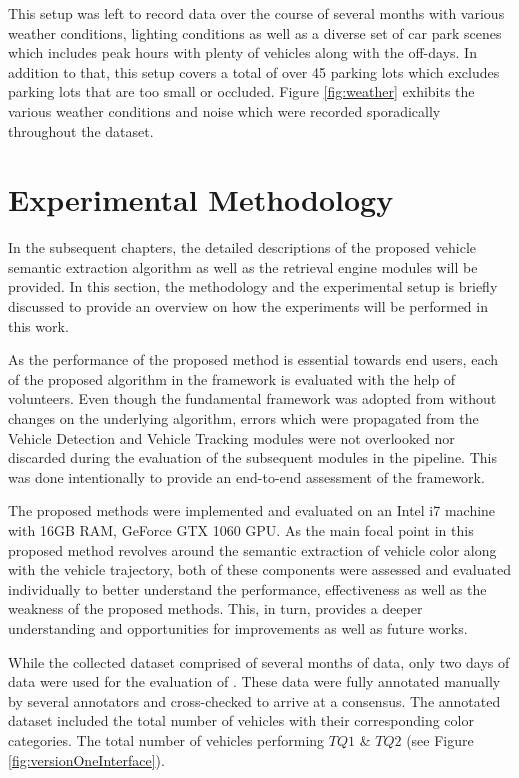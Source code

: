 This setup was left to record data over the course of several months with various weather conditions, lighting conditions as well as a diverse set of car park scenes which includes peak hours with plenty of vehicles along with the off-days. In addition to that, this setup covers a total of over 45 parking lots which excludes parking lots that are too small or occluded. Figure \ref{fig:weather} exhibits the various weather conditions and noise which were recorded sporadically throughout the dataset.





\section{Experimental Methodology}
\label{sec:expmethodology}

In the subsequent chapters, the detailed descriptions of the proposed vehicle semantic extraction algorithm as well as the retrieval engine modules will be provided. In this section, the methodology and the experimental setup is briefly discussed to provide an overview on how the experiments will be performed in this work.

As the performance of the proposed method is essential towards end users, each of the proposed algorithm in the framework is evaluated with the help of volunteers. Even though the fundamental framework was adopted from \cite{lim2017} without changes on the underlying algorithm, errors which were propagated from the Vehicle Detection and Vehicle Tracking modules were not overlooked nor discarded during the evaluation of the subsequent modules in the pipeline. This was done intentionally to provide an end-to-end assessment of the framework. 

The proposed methods were implemented and evaluated on an Intel i7 machine with 16GB RAM, GeForce GTX 1060 GPU. As the main focal point in this proposed method revolves around the semantic extraction of vehicle color along with the vehicle trajectory, both of these components were assessed and evaluated individually to better understand the performance, effectiveness as well as the weakness of the proposed methods. This, in turn, provides a deeper understanding and opportunities for improvements as well as future works. 

While the collected dataset comprised of several months of data, only two days of data were used for the evaluation of \versionOneRet. These data were  fully annotated manually by several annotators and cross-checked to arrive at a consensus. The  annotated dataset included the total number of vehicles with their corresponding color categories. The total number of vehicles performing $TQ1$ \& $TQ2$ (see Figure \ref{fig:versionOneInterface}).


